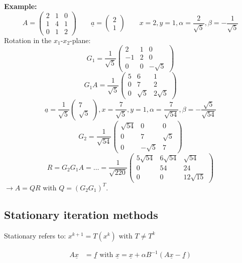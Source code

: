 \documentclass{article}
\begin{document}
\textbf{Example:}
\[
  A = \begin{pmatrix} 2 & 1 & 0 \\ 1 & 4 & 1 \\ 0 & 1 & 2 \end{pmatrix}
  \qquad
  \underline{a} = \begin{pmatrix} 2 \\ 1 \end{pmatrix}
  \qquad
  x = 2, y = 1, \alpha = \frac2{\sqrt{5}}, \beta = -\frac1{\sqrt{5}}
\]
Rotation in the $x_1$-$x_2$-plane:
\[ G_1 = \frac{1}{\sqrt{5}} \begin{pmatrix} 2 & 1 & 0 \\ -1 & 2 & 0 \\ 0 & 0 & -\sqrt{5} \end{pmatrix} \]
\[ G_1 A = \frac{1}{\sqrt{5}} \begin{pmatrix} 5 & 6 & 1 \\ 0 & 7 & 2 \\ 0 & \sqrt{5} & 2 \sqrt{5} \end{pmatrix} \]
\[ \underline{a} = \frac{1}{\sqrt{5}} \begin{pmatrix} 7 \\ \sqrt{5} \end{pmatrix}, x = \frac{7}{\sqrt{5}}, y = 1, \alpha = \frac{7}{\sqrt{54}}, \beta = -\frac{\sqrt{5}}{\sqrt{54}} \]
\[ G_2 = \frac{1}{\sqrt{54}} \begin{pmatrix} \sqrt{54} & 0 & 0 \\ 0 & 7 & \sqrt{5} \\ 0 & -\sqrt{5} & 7 \end{pmatrix} \]
\[ R = G_2 G_1 A = \ldots = \frac{1}{\sqrt{220}} \begin{pmatrix} 5\sqrt{54} & 6\sqrt{54} & \sqrt{54} \\ 0 & 54 & 24 \\ 0 & 0 & 12 \sqrt{15} \end{pmatrix} \]
$\to A = QR$ with $Q = (G_2 G_1)^T$.

\subsection{Stationary iteration methods}

Stationary refers to: $x^{k+1} = T(x^k) \text{ with } T \neq T^k$

\begin{align}
  A \underline{x} &= \underline{f} \text{ with } \underline{x} = \underline{x} + \alpha B^{-1} (A\underline{x} - \underline{f}) \label{eq:eq41}
\end{align}
\end{document}
